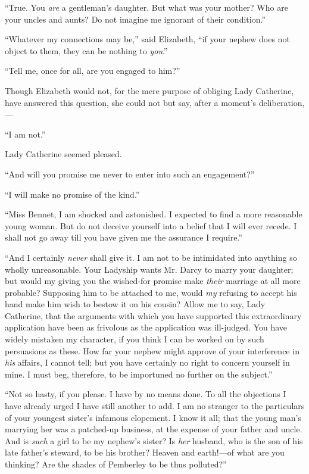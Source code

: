 \documentclass[12pt,openright]{book}
\begin{document}
“True. You \textit{are} a gentleman’s daughter. But what was your mother? Who are your uncles and aunts? Do not imagine me ignorant of their condition.”

“Whatever my connections may be,” said Elizabeth, “if your nephew does not object to them, they can be nothing to \textit{you}.”

“Tell me, once for all, are you engaged to him?”

Though Elizabeth would not, for the mere purpose of obliging Lady Catherine, have answered this question, she could not but say, after a moment’s deliberation,—

“I am not.”

Lady Catherine seemed pleased.

“And will you promise me never to enter into such an engagement?”

“I will make no promise of the kind.”

“Miss Bennet, I am shocked and astonished. I expected to find a more reasonable young woman. But do not deceive yourself into a belief that I will ever recede. I shall not go away till you have given me the assurance I require.”

“And I certainly \textit{never} shall give it. I am not to be intimidated into anything so wholly unreasonable. Your Ladyship wants Mr. Darcy to marry your daughter; but would my giving you the wished-for promise make \textit{their} marriage at all more probable? Supposing him to be attached to me, would \textit{my} refusing to accept his hand make him wish to bestow it on his cousin? Allow me to say, Lady Catherine, that the arguments with which you have supported this extraordinary application have been as frivolous as the application was ill-judged. You have widely mistaken my character, if you think I can be worked on by such persuasions as these. How far your nephew might approve of your interference in \textit{his} affairs, I cannot tell; but you have certainly no right to concern yourself in mine. I must beg, therefore, to be importuned no further on the subject.”

“Not so hasty, if you please. I have by no means done. To all the objections I have already urged I have still another to add. I am no stranger to the particulars of your youngest sister’s infamous elopement. I know it all; that the young man’s marrying her was a patched-up business, at the expense of your father and uncle. And is \textit{such} a girl to be my nephew’s sister? Is \textit{her} husband, who is the son of his late father’s steward, to be his brother? Heaven and earth!—of what are you thinking? Are the shades of Pemberley to be thus polluted?”
\end{document}
